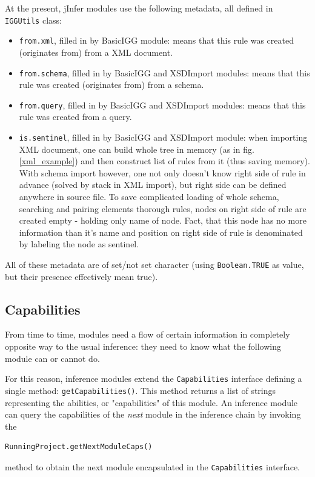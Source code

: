 \documentclass[a4paper,10pt,oneside]{article}
\newcommand{\code}[1]{\texttt{#1}}
\begin{document}
At the present, jInfer modules use the following metadata, all defined in \code{IGGUtils} class:
\begin{itemize}
	\item \code{from.xml}, filled in by BasicIGG module: means that this rule was created (originates from) from a XML document.
	\item \code{from.schema}, filled in by BasicIGG and XSDImport modules: means that this rule was created (originates from) from a schema.
	\item \code{from.query}, filled in by BasicIGG and XSDImport modules: means that this rule was created from a query.
	\item \code{is.sentinel}, filled in by  BasicIGG and XSDImport module: when importing XML document, one can build whole tree in memory (as in fig. \ref{xml_example}) and then construct list of rules from it (thus saving memory). With schema import however, one not only doesn't know right side of rule in advance (solved by stack in XML import), but right side can be defined anywhere in source file. To save complicated loading of whole schema, searching and pairing elements thorough rules, nodes on right side of rule are created empty - holding only name of node. Fact, that this node has no more information than it's name and position on right side of rule is denominated by labeling the node as sentinel.
\end{itemize}
All of these metadata are of set/not set character (using \code{Boolean.TRUE} as value, but their presence effectively mean true).

\subsection{Capabilities} \label{section_capabilities}
From time to time, modules need a flow of certain information in completely opposite way to the usual inference: they need to know what the following module can or cannot do.

For this reason, inference modules extend the \code{Capabilities} interface defining a single method: \code{getCapabilities()}. This method returns a list of strings representing the abilities, or "capabilities" of this module.
An inference module can query the capabilities of the \emph{next} module in the inference chain by invoking the 
\begin{verbatim}
RunningProject.getNextModuleCaps()
\end{verbatim}
method to obtain the next module encapsulated in the \code{Capabilities} interface.
\end{document}
